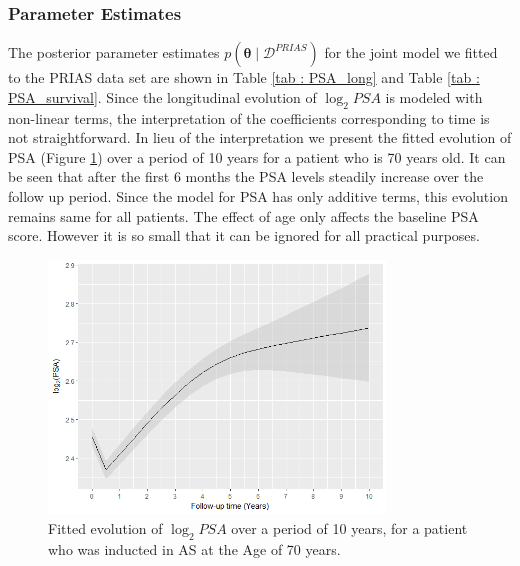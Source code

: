 \subsubsection{Parameter Estimates}
\label{subsec : param_estimates_jm_fit_prias}
The posterior parameter estimates $p(\boldsymbol{\theta} \mid \mathcal{D}^{PRIAS})$ for the joint model we fitted to the PRIAS data set are shown in Table \ref{tab : PSA_long} and Table \ref{tab : PSA_survival}. Since the longitudinal evolution of $\log_2 PSA$ is modeled with non-linear terms, the interpretation of the coefficients corresponding to time is not straightforward. In lieu of the interpretation we present the fitted evolution of PSA (Figure \ref{fig : fitted_trend_psa}) over a period of 10 years for a patient who is 70 years old. It can be seen that after the first 6 months the PSA levels steadily increase over the follow up period. Since the model for PSA has only additive terms, this evolution remains same for all patients. The effect of age only affects the baseline PSA score. However it is so small that it can be ignored for all practical purposes.\\

\begin{figure}[!htb]
	\centering
    \captionsetup{justification=centering}
	\includegraphics[width=0.8\textwidth]{images/fitted_trend_psa.png}
	\caption{Fitted evolution of $\log_2 PSA$ over a period of 10 years, for a patient who was inducted in AS at the Age of 70 years.}
	\label{fig : fitted_trend_psa}
\end{figure}


